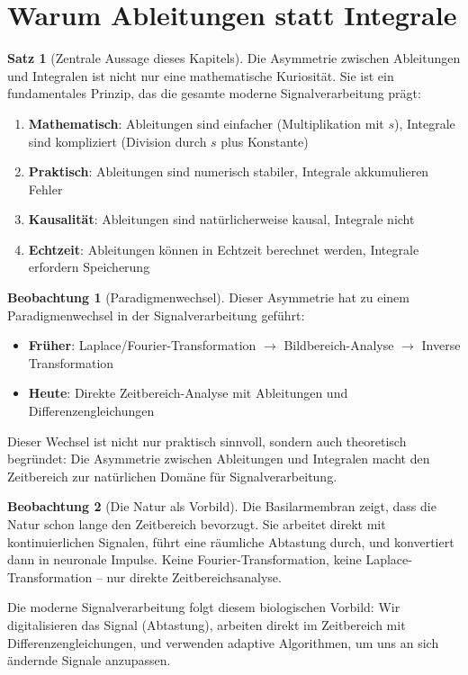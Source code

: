 ﻿\documentclass[a4paper,12pt]{report}
\theoremstyle{definition}
\newtheorem{satz}{Satz}
\newtheorem{beobachtung}{Beobachtung}
\begin{document}
	\section{Warum Ableitungen statt Integrale}
	
	\begin{satz}[Zentrale Aussage dieses Kapitels]
		
		Die Asymmetrie zwischen Ableitungen und Integralen ist nicht nur eine mathematische Kuriosität. Sie ist ein fundamentales Prinzip, das die gesamte moderne Signalverarbeitung prägt:
		
		\begin{enumerate}
			\item[-] \textbf{Mathematisch}: Ableitungen sind einfacher (Multiplikation mit $s$), Integrale sind kompliziert (Division durch $s$ plus Konstante)
			\item[-] \textbf{Praktisch}: Ableitungen sind numerisch stabiler, Integrale akkumulieren Fehler
			\item[-] \textbf{Kausalität}: Ableitungen sind natürlicherweise kausal, Integrale nicht
			\item[-] \textbf{Echtzeit}: Ableitungen können in Echtzeit berechnet werden, Integrale erfordern Speicherung
		\end{enumerate}
	\end{satz}
	
	\begin{beobachtung}[Paradigmenwechsel]
		
		Dieser Asymmetrie hat zu einem Paradigmenwechsel in der Signalverarbeitung geführt:
		
		\begin{itemize}
			\item[-] \textbf{Früher}: Laplace/Fourier-Transformation $\to$ Bildbereich-Analyse $\to$ Inverse Transformation
			\item[-] \textbf{Heute}: Direkte Zeitbereich-Analyse mit Ableitungen und Differenzengleichungen
		\end{itemize}
		
		Dieser Wechsel ist nicht nur praktisch sinnvoll, sondern auch theoretisch begründet: Die Asymmetrie zwischen Ableitungen und Integralen macht den Zeitbereich zur natür\-lichen Domäne für Signalverarbeitung.
	\end{beobachtung}
	
	\begin{beobachtung}[Die Natur als Vorbild]
		
		Die Basilarmembran zeigt, dass die Natur schon lange den Zeitbereich bevorzugt. Sie arbeitet direkt mit kontinuierlichen Signalen, führt eine räumliche Abtastung durch, und konvertiert dann in neuronale Impulse. Keine Fourier-Transformation, keine Laplace-Transformation -- nur direkte Zeitbereichsanalyse.
		
		Die moderne Signalverarbeitung folgt diesem biologischen Vorbild: Wir digitalisieren das Signal (Abtastung), arbeiten direkt im Zeitbereich mit Differenzengleichungen, und verwenden adaptive Algorithmen, um uns an sich ändernde Signale anzupassen.
	\end{beobachtung}
	
\end{document}
